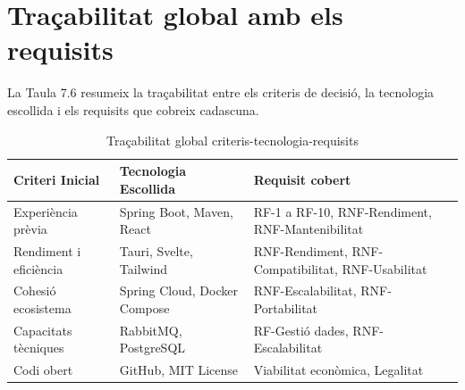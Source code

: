 \section{Traçabilitat global amb els requisits}
La Taula 7.6 resumeix la traçabilitat entre els criteris de decisió, la tecnologia escollida i els requisits que cobreix cadascuna.

\begin{table}
\centering
\begin{tabular}{|l|l|l|}
\hline
\textbf{Criteri Inicial} & \textbf{Tecnologia Escollida} & \textbf{Requisit cobert} \\
\hline
Experiència prèvia & Spring Boot, Maven, React & RF-1 a RF-10, RNF-Rendiment, RNF-Mantenibilitat \\
Rendiment i eficiència & Tauri, Svelte, Tailwind & RNF-Rendiment, RNF-Compatibilitat, RNF-Usabilitat \\
Cohesió ecosistema & Spring Cloud, Docker Compose & RNF-Escalabilitat, RNF-Portabilitat \\
Capacitats tècniques & RabbitMQ, PostgreSQL & RF-Gestió dades, RNF-Escalabilitat \\
Codi obert & GitHub, MIT License & Viabilitat econòmica, Legalitat \\
\hline
\end{tabular}
\caption{Traçabilitat global criteris-tecnologia-requisits}
\end{table}